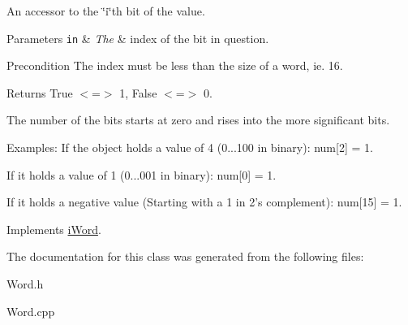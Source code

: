 An accessor to the \char`\"{}i\char`\"{}th bit of the value. 


\begin{DoxyParams}[1]{Parameters}
\mbox{\tt in}  & {\em The} & index of the bit in question. \\
\hline
\end{DoxyParams}
\begin{DoxyPrecond}{Precondition}
The index must be less than the size of a word, ie. 16. 
\end{DoxyPrecond}
\begin{DoxyReturn}{Returns}
True $<$=$>$ 1, False $<$=$>$ 0.
\end{DoxyReturn}
The number of the bits starts at zero and rises into the more significant bits. \begin{DoxyParagraph}{Examples:}
If the object holds a value of 4 (0...100 in binary): num\mbox{[}2\mbox{]} = 1.\par
 If it holds a value of 1 (0...001 in binary): num\mbox{[}0\mbox{]} = 1.\par
 If it holds a negative value (Starting with a 1 in 2's complement): num\mbox{[}15\mbox{]} = 1. 
\end{DoxyParagraph}


Implements \hyperlink{classiWord_a2bd140904379329b74c3e1af83eb3a85}{iWord}.



The documentation for this class was generated from the following files:\begin{DoxyCompactItemize}
\item 
Word.h\item 
Word.cpp\end{DoxyCompactItemize}
